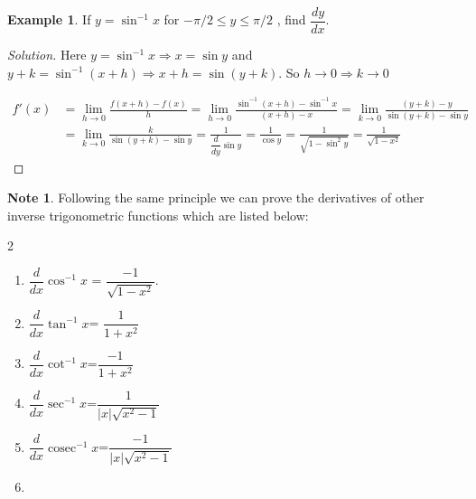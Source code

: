 \documentclass[../../main.tex]{subfiles}
\DeclareMathOperator{\cosec}{cosec}
\theoremstyle{definition}
\newtheorem{example}{Example}[section]
\newtheorem*{note}{Note}
\newenvironment{solution}
    {\begin{proof}[Solution]}
    {\end{proof}}
\begin{document}
\begin{example}
If $y= \sin^{-1}x$ for $-{\pi/2}\leq y\leq  {\pi/2}$ , find  $\dfrac{dy}{dx}$.    
\end{example}

\begin{solution}
Here $y=\sin^{-1}x \Rightarrow x=\sin y$ and $y+k=\sin^{-1} (x+h) \Rightarrow x+h = \sin (y+k)$. So $h\rightarrow 0\Rightarrow k\rightarrow 0$ 

\begin{align*}
    f'(x) &= \lim_{h \rightarrow 0} \frac {f(x+h)-f(x)}{h} = \lim_{h \rightarrow 0} \frac {\sin^{-1} (x+h)-\sin^{-1}x}{(x+h)-x} = \lim_{k \rightarrow 0} \frac {(y+k)-y}{\sin (y+k)-\sin y} \\ 
    &= \lim_{k \rightarrow 0} \frac {k}{\sin (y+k)-\sin y} = \frac{1}{\dfrac{d}{dy}\sin y} = \frac{1}{\cos y} = \frac{1}{\sqrt{1-\sin^2 y}} = \frac{1}{\sqrt{1-x^2}}
\end{align*}
\end{solution}

\begin{note}
Following the same principle we can prove the derivatives of other inverse trigonometric functions which are listed below:
\begin{multicols}{2}
\begin{enumerate}[label=(\roman*)]
    \item $\dfrac{d}{dx} \cos ^{-1} x$ = $\dfrac{-1}{\sqrt{1-x^2}}.$
    \item $\dfrac{d}{dx} \tan^{-1}{x}$= $\dfrac{1}{1+x^2}$
    \item $\dfrac{d}{dx} \cot^{-1} x$=$\dfrac{-1}{1+x^2}$
    \item $\dfrac{d}{dx} \sec^{-1} x$=$\dfrac{1}{|x|\sqrt{x^2-1}}$
    \item $\dfrac{d}{dx} \cosec^{-1} x$=$\dfrac{-1}{|x|\sqrt{x^2-1}}$
    \item[] \phantom{x}
\end{enumerate}
\end{multicols}
\end{note}
\end{document}

